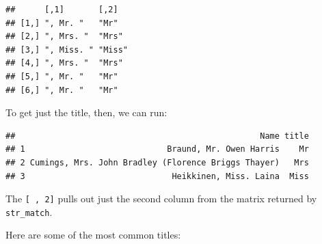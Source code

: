 \documentclass[]{book}
\makeatletter
\newenvironment{Shaded}{\begin{snugshade}}{\end{snugshade}}
\newcommand{\KeywordTok}[1]{\textcolor[rgb]{0.13,0.29,0.53}{\textbf{{#1}}}}
\newcommand{\DataTypeTok}[1]{\textcolor[rgb]{0.13,0.29,0.53}{{#1}}}
\newcommand{\DecValTok}[1]{\textcolor[rgb]{0.00,0.00,0.81}{{#1}}}
\newcommand{\CharTok}[1]{\textcolor[rgb]{0.31,0.60,0.02}{{#1}}}
\newcommand{\StringTok}[1]{\textcolor[rgb]{0.31,0.60,0.02}{{#1}}}
\newcommand{\NormalTok}[1]{{#1}}
\newenvironment{kframe}{%
\medskip{}
\setlength{\fboxsep}{.8em}
 \def\at@end@of@kframe{}%
 \ifinner\ifhmode%
  \def\at@end@of@kframe{\end{minipage}}%
  \begin{minipage}{\columnwidth}%
 \fi\fi%
 \def\FrameCommand##1{\hskip\@totalleftmargin \hskip-\fboxsep
 \colorbox{shadecolor}{##1}\hskip-\fboxsep
     \hskip-\linewidth \hskip-\@totalleftmargin \hskip\columnwidth}%
 \MakeFramed {\advance\hsize-\width
   \@totalleftmargin\z@ \linewidth\hsize
   \@setminipage}}%
 {\par\unskip\endMakeFramed%
 \at@end@of@kframe}
\renewenvironment{Shaded}{\begin{kframe}}{\end{kframe}}
\makeatother
\begin{document}
\begin{Shaded}
\end{Shaded}

\begin{verbatim}
##      [,1]       [,2]  
## [1,] ", Mr. "   "Mr"  
## [2,] ", Mrs. "  "Mrs" 
## [3,] ", Miss. " "Miss"
## [4,] ", Mrs. "  "Mrs" 
## [5,] ", Mr. "   "Mr"  
## [6,] ", Mr. "   "Mr"
\end{verbatim}

To get just the title, then, we can run:

\begin{Shaded}
\end{Shaded}

\begin{verbatim}
##                                                  Name title
## 1                             Braund, Mr. Owen Harris    Mr
## 2 Cumings, Mrs. John Bradley (Florence Briggs Thayer)   Mrs
## 3                              Heikkinen, Miss. Laina  Miss
\end{verbatim}

The \texttt{{[}\ ,\ 2{]}} pulls out just the second column from the
matrix returned by \texttt{str\_match}.

Here are some of the most common titles:
\end{document}
